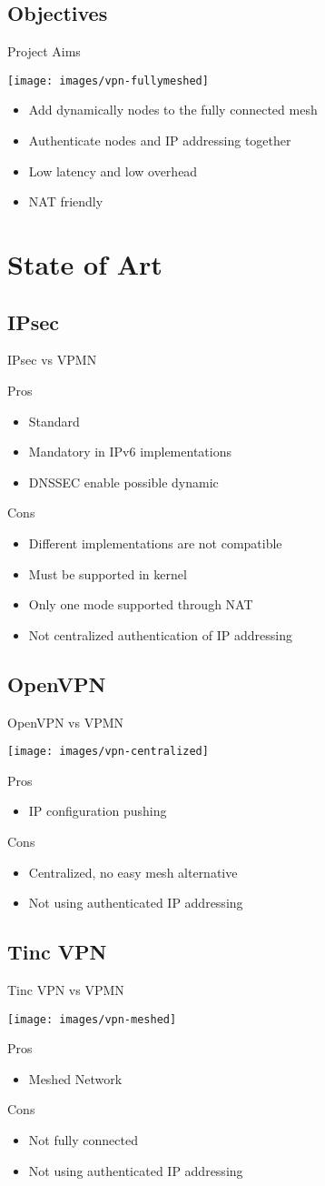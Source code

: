 \documentclass{beamer}
\newcommand*{\comparativeframe}[5]{
\begin{frame}{#1}
	#2
	\begin{exampleblock}{Pros}
		\begin{itemize}
		#3
		\end{itemize}
	\end{exampleblock}
	\begin{alertblock}{Cons}
		\begin{itemize}
		#4
		\end{itemize}
	\end{alertblock}
	#5
\end{frame}
}
\begin{document}
\subsection*{Objectives}
\begin{frame}{Project Aims}
	\begin{center}
	\texttt{[image: images/vpn-fullymeshed]}
	\end{center}
	\begin{itemize}
	\item Add dynamically nodes to the fully connected mesh
	\item Authenticate nodes and IP addressing together
	\item Low latency and low overhead
	\item NAT friendly
	\end{itemize}
\end{frame}

\section{State of Art}
\subsection{IPsec}
\comparativeframe{IPsec vs VPMN}{}
{%
\item Standard
\item Mandatory in IPv6 implementations
\item DNSSEC enable possible dynamic
}{%
\item Different implementations are \alert{not compatible}
\item Must be supported in kernel
\item Only one mode supported through NAT
\item Not centralized authentication of IP addressing
}{}
\subsection{OpenVPN}
\comparativeframe{OpenVPN vs VPMN}
{\begin{center}
\texttt{[image: images/vpn-centralized]}
\end{center}}
{%
\item IP configuration pushing
}{%
\item Centralized, no easy mesh alternative
\item Not using authenticated IP addressing
}{}
\subsection{Tinc VPN}
\comparativeframe{Tinc VPN vs VPMN}
{\begin{center}
\texttt{[image: images/vpn-meshed]}
\end{center}}
{%
\item Meshed Network
}{%
\item Not fully connected
\item Not using authenticated IP addressing
}{}
\end{document}
